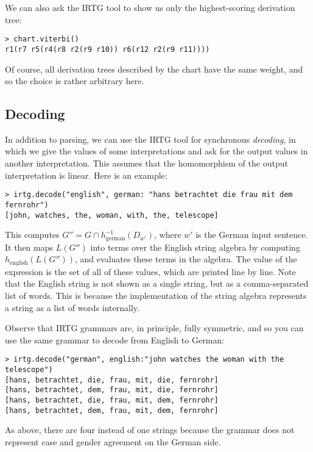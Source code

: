 \documentclass[11pt]{article}
\begin{document}
We can also ask the IRTG tool to show us only the highest-scoring
derivation tree:

\begin{verbatim}
> chart.viterbi()
r1(r7 r5(r4(r8 r2(r9 r10)) r6(r12 r2(r9 r11))))
\end{verbatim}

Of course, all derivation trees described by the chart have the same
weight, and so the choice is rather arbitrary here.

\subsection{Decoding}

In addition to parsing, we can use the IRTG tool for synchronous
\emph{decoding}, in which we give the values of some interpretations
and ask for the output values in another interpretation. This assumes
that the homomorphism of the output interpretation is linear.  Here is
an example:

\begin{verbatim}
> irtg.decode("english", german: "hans betrachtet die frau mit dem fernrohr")
[john, watches, the, woman, with, the, telescope]
\end{verbatim}

This computes $G'' = G \cap h^{-1}_\mathrm{german}(D_{w'})$, where
$w'$ is the German input sentence. It then maps $L(G'')$ into terms
over the English string algebra by computing
$h_\mathrm{english}(L(G''))$, and evaluates these terms in the
algebra. The value of the expression is the set of all of these
values, which are printed line by line. Note that the English string
is not shown as a single string, but as a comma-separated list of
words.  This is because the implementation of the string algebra
represents a string as a list of words internally.

Observe that IRTG grammars are, in principle, fully symmetric, and so
you can use the same grammar to decode from English to German:

\begin{verbatim}
> irtg.decode("german", english:"john watches the woman with the telescope")
[hans, betrachtet, die, frau, mit, die, fernrohr]
[hans, betrachtet, dem, frau, mit, die, fernrohr]
[hans, betrachtet, die, frau, mit, dem, fernrohr]
[hans, betrachtet, dem, frau, mit, dem, fernrohr]
\end{verbatim}

As above, there are four instead of one strings because the grammar does
not represent case and gender agreement on the German side.
\end{document}
